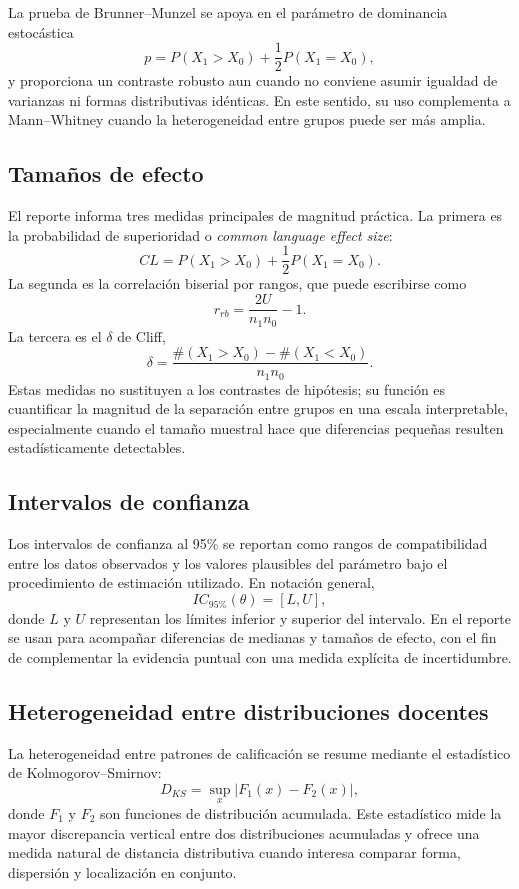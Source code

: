 \documentclass[8pt,a4paper]{article} %
\numberwithin{figure}{subsection}
\begin{document}
La prueba de Brunner--Munzel se apoya en el parámetro de dominancia estocástica
\[
p=P(X_1>X_0)+\frac{1}{2}P(X_1=X_0),
\]
y proporciona un contraste robusto aun cuando no conviene asumir igualdad de varianzas ni formas distributivas idénticas. En este sentido, su uso complementa a Mann--Whitney cuando la heterogeneidad entre grupos puede ser más amplia.

\subsection{Tamaños de efecto}
El reporte informa tres medidas principales de magnitud práctica. La primera es la probabilidad de superioridad o \textit{common language effect size}:
\[
CL=P(X_1>X_0)+\frac{1}{2}P(X_1=X_0).
\]
La segunda es la correlación biserial por rangos, que puede escribirse como
\[
r_{rb}=\frac{2U}{n_1n_0}-1.
\]
La tercera es el $\delta$ de Cliff,
\[
\delta=\frac{\#(X_1>X_0)-\#(X_1<X_0)}{n_1n_0}.
\]
Estas medidas no sustituyen a los contrastes de hipótesis; su función es cuantificar la magnitud de la separación entre grupos en una escala interpretable, especialmente cuando el tamaño muestral hace que diferencias pequeñas resulten estadísticamente detectables.

\subsection{Intervalos de confianza}
Los intervalos de confianza al 95\% se reportan como rangos de compatibilidad entre los datos observados y los valores plausibles del parámetro bajo el procedimiento de estimación utilizado. En notación general,
\[
IC_{95\%}(\theta)=[L,U],
\]
donde $L$ y $U$ representan los límites inferior y superior del intervalo. En el reporte se usan para acompañar diferencias de medianas y tamaños de efecto, con el fin de complementar la evidencia puntual con una medida explícita de incertidumbre.

\subsection{Heterogeneidad entre distribuciones docentes}
La heterogeneidad entre patrones de calificación se resume mediante el estadístico de Kolmogorov--Smirnov:
\[
D_{KS}=\sup_x |F_1(x)-F_2(x)|,
\]
donde $F_1$ y $F_2$ son funciones de distribución acumulada. Este estadístico mide la mayor discrepancia vertical entre dos distribuciones acumuladas y ofrece una medida natural de distancia distributiva cuando interesa comparar forma, dispersión y localización en conjunto.
\end{document}
